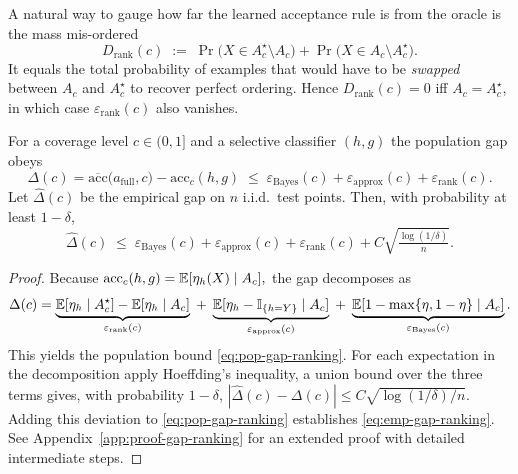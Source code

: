 \begin{remark}
A natural way to gauge how far the learned acceptance rule is from the oracle is
the mass mis-ordered
\begin{equation}
    D_{\text{rank}}(c)\;:=\;
    \Pr\bigl(X\in A_c^{\star}\setminus A_c\bigr)
    +\Pr\bigl(X\in A_c\setminus A_c^{\star}\bigr).
\end{equation}
It equals the total probability of examples that would have to be
\emph{swapped} between $A_c$ and $A_c^{\star}$ to recover perfect ordering.
Hence $D_{\text{rank}}(c)=0$ iff $A_c=A_c^{\star}$, in which case
$\varepsilon_{\text{rank}}(c)$ also vanishes.
\end{remark}

\begin{theorem}
\label{thm:gap}
For a coverage level \(c\in(0,1]\) and a selective classifier \((h,g)\) the population gap obeys
\begin{equation}
\Delta(c)=\overline{\mathrm{acc}}\bigl(a_{\mathrm{full}},c\bigr)
-\mathrm{acc}_c(h,g)
\;\le\;
\varepsilon_{\text{Bayes}}(c)
+\varepsilon_{\text{approx}}(c)
+\varepsilon_{\text{rank}}(c).
\label{eq:pop-gap-ranking}
\end{equation}
Let \(\widehat{\Delta}(c)\) be the empirical gap on \(n\) i.i.d.\
test points.  Then, with probability at least \(1-\delta\),
\begin{equation}
\widehat{\Delta}(c)
\;\le\;
\varepsilon_{\text{Bayes}}(c)
+\varepsilon_{\text{approx}}(c)
+\varepsilon_{\text{rank}}(c)
+C\sqrt{\tfrac{\log(1/\delta)}{n}}.
\label{eq:emp-gap-ranking}
\end{equation}
\end{theorem}

\begin{proof}
Because
\(
\mathrm{acc}_c(h,g)=\mathbb{E}[\eta_h(X)\mid A_c],
\)
the gap decomposes as
\[
  \Delta(c)
  =\underbrace{\mathbb{E}[\eta_h\mid A_c^{\star}]
               -\mathbb{E}[\eta_h\mid A_c]}_{\varepsilon_{\text{rank}}(c)}
   \;+\;
   \underbrace{\mathbb{E}[\eta_h-\mathbb{I}_{\{h=Y\}}\mid A_c]}
              _{\varepsilon_{\text{approx}}(c)}
   \;+\;
   \underbrace{\mathbb{E}[1-\max\{\eta,1-\eta\}\mid A_c]}
              _{\varepsilon_{\text{Bayes}}(c)}.
\]
This yields the population bound \eqref{eq:pop-gap-ranking}. 
For each expectation in the decomposition apply Hoeffding’s
inequality, a union bound over the three terms gives, with probability
\(1-\delta\),
\(
  |\widehat{\Delta}(c)-\Delta(c)|
  \le C\sqrt{\log(1/\delta)/n}.
\)
Adding this deviation to \eqref{eq:pop-gap-ranking} establishes
\eqref{eq:emp-gap-ranking}. \\See Appendix~\ref{app:proof-gap-ranking} for an extended proof with detailed intermediate steps.
\end{proof}

